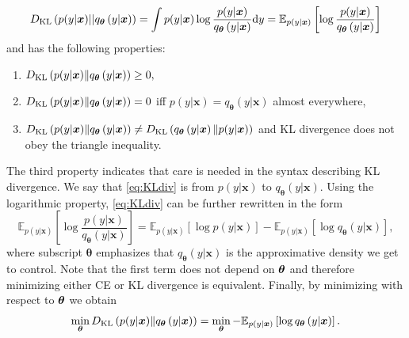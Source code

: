 \begin{equation}\label{eq:KLdiv}
D_{\mathrm{KL}} \left(p(y| \boldsymbol{x}) || q_{\boldsymbol{\theta}}\left(y|\boldsymbol{x}\right) \right) = \int p(y| \boldsymbol{x})\log\frac{p(y| \boldsymbol{x})}{q_{\boldsymbol{\theta}}\left(y|\boldsymbol{x}\right)}\mathrm{d}{y} = \mathbb{E}_{p(y| \boldsymbol{x})} \left[\log\frac{p(y| \boldsymbol{x})}{q_{\boldsymbol{\theta}}\left(y|\boldsymbol{x}\right)} \right]
\end{equation}
and has the following properties:
\begin{enumerate}
\item $D_{\mathrm{KL}} \left(p(y| \boldsymbol{x}) \Vert q_{\boldsymbol{\theta}}\left(y|\boldsymbol{x}\right) \right) \geq 0,$
\item $D_{\mathrm{KL}} \left(p(y| \boldsymbol{x}) \Vert q_{\boldsymbol{\theta}}\left(y|\boldsymbol{x}\right) \right) = 0$ iff $p(y| \boldsymbol{x}) = q_{\boldsymbol{\theta}}\left(y|\boldsymbol{x}\right)$ almost everywhere,
\item $D_{\mathrm{KL}} \left(p(y| \boldsymbol{x}) \Vert q_{\boldsymbol{\theta}}\left(y|\boldsymbol{x}\right) \right) \neq D_{\mathrm{KL}} \left(q_{\boldsymbol{\theta}}\left(y|\boldsymbol{x}\right) \Vert p(y| \boldsymbol{x}) \right)$ and KL divergence does not obey the triangle inequality.
\end{enumerate}
The third property indicates that care is needed in the syntax describing KL divergence. We say that \eqref{eq:KLdiv} is from $p(y| \boldsymbol{x})$ to $q_{\boldsymbol{\theta}}\left(y|\boldsymbol{x}\right)$. Using the logarithmic property, \eqref{eq:KLdiv} can be further rewritten in the form 
\begin{equation}
	 \mathbb{E}_{p(y| \boldsymbol{x})} \left[\log\frac{p(y| \boldsymbol{x})}{q_{\boldsymbol{\theta}}\left(y|\boldsymbol{x}\right)} \right] = 
	 \mathbb{E}_{p(y| \boldsymbol{x})} \left[\log p(y| \boldsymbol{x}) \right] - \mathbb{E}_{p(y| \boldsymbol{x})} \left[\log q_{\boldsymbol{\theta}}\left(y|\boldsymbol{x}\right) \right],
	\end{equation}
where subscript $\boldsymbol{\theta}$ emphasizes that $q_{\boldsymbol{\theta}}\left(y|\boldsymbol{x}\right)$ is the approximative density we get to control. Note that
the first term does not depend on $\boldsymbol{\theta}$ and therefore minimizing either CE or KL divergence is equivalent. Finally, by minimizing with respect to $\boldsymbol{\theta}$ we obtain
\begin{equation}
\min_{\boldsymbol{\theta}} D_{\mathrm{KL}} \left(p(y| \boldsymbol{x}) \Vert q_{\boldsymbol{\theta}}\left(y|\boldsymbol{x}\right) \right) = \min_{\boldsymbol{\theta}} - \mathbb{E}_{p(y| \boldsymbol{x})}\left[ \log q_{\boldsymbol{\theta}}\left(y|\boldsymbol{x}\right)\right].
\end{equation}
